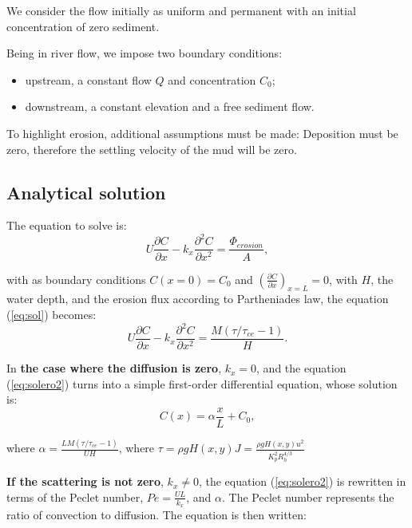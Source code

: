 We consider the flow initially as uniform and permanent with an initial
concentration of zero sediment.

Being in river flow, we impose two boundary conditions:

\begin{itemize}
\item upstream, a constant flow $Q$ and concentration $C_0$;
\item downstream, a constant elevation and a free sediment flow.
\end{itemize}

To highlight erosion, additional assumptions must be made: Deposition
must be zero, therefore the settling velocity of the mud will be zero.

\subsection{Analytical solution}

The equation to solve is:
\begin{equation}
U \frac{\partial C}{\partial x} - k_x \frac{\partial^2 C}{\partial x^2} =
\frac{ \Phi_{erosion}}{ A},
\label{eq:sol}
\end{equation}

with as boundary conditions $C(x=0)=C_0$ and
$\left( \frac{\partial C}{\partial x} \right)_{x=L}=0$,
with $H$, the water depth, and the erosion flux according to
Partheniades law, the equation (\ref{eq:sol}) becomes:
\begin{equation}
U \frac{\partial C}{\partial x} - k_x \frac{\partial^2 C}{\partial x^2} =
\frac{ M (\tau/\tau_{ce}-1)}{ H}.
\label{eq:solero2}
\end{equation}

In \textbf{the case where the diffusion is zero}, $k_x=0 $, and the
equation (\ref{eq:solero2}) turns into a simple first-order
differential equation, whose solution is:
\begin{equation}
C(x)=\alpha \frac{x}{L}+ C_0,
\label{eq:sol3}
\end{equation}

where $ \alpha = \frac{LM (\tau/\tau_{ce}-1) }{UH} $,
where
$\tau= \rho g H(x,y) J = \frac{\rho g H(x,y) u^2}{K_p^2 R_h^{4/3}}$

\textbf{If the scattering is not zero}, $k_x\neq 0$, the equation
(\ref{eq:solero2}) is rewritten in terms of the Peclet number,
$Pe=\frac{UL}{k_x}$, and $\alpha$. The Peclet number represents
the ratio of convection to diffusion. The equation is then written:

